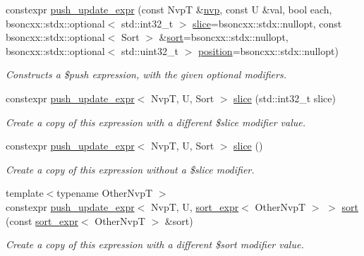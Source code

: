 \begin{DoxyCompactItemize}
\item 
constexpr \hyperlink{classmangrove_1_1push__update__expr_aa1a622b1363907707cd17a30ab5a6a01}{push\+\_\+update\+\_\+expr} (const NvpT \&\hyperlink{classmangrove_1_1nvp}{nvp}, const U \&val, bool each, bsoncxx\+::stdx\+::optional$<$ std\+::int32\+\_\+t $>$ \hyperlink{classmangrove_1_1push__update__expr_a2980ff871acc817f16c1745c8c826ada}{slice}=bsoncxx\+::stdx\+::nullopt, const bsoncxx\+::stdx\+::optional$<$ Sort $>$ \&\hyperlink{classmangrove_1_1push__update__expr_a170e82be0de4d0d4996ea3f7db6f8766}{sort}=bsoncxx\+::stdx\+::nullopt, bsoncxx\+::stdx\+::optional$<$ std\+::uint32\+\_\+t $>$ \hyperlink{classmangrove_1_1push__update__expr_ae4ee751327e25ba7063174305907db41}{position}=bsoncxx\+::stdx\+::nullopt)
\begin{DoxyCompactList}\small\item\em Constructs a \$push expression, with the given optional modifiers. \end{DoxyCompactList}\item 
constexpr \hyperlink{classmangrove_1_1push__update__expr}{push\+\_\+update\+\_\+expr}$<$ NvpT, U, Sort $>$ \hyperlink{classmangrove_1_1push__update__expr_a2980ff871acc817f16c1745c8c826ada}{slice} (std\+::int32\+\_\+t slice)
\begin{DoxyCompactList}\small\item\em Create a copy of this expression with a different \$slice modifier value. \end{DoxyCompactList}\item 
constexpr \hyperlink{classmangrove_1_1push__update__expr}{push\+\_\+update\+\_\+expr}$<$ NvpT, U, Sort $>$ \hyperlink{classmangrove_1_1push__update__expr_a33446894ef0a2a5fbfe298d1bb09ef7a}{slice} ()
\begin{DoxyCompactList}\small\item\em Create a copy of this expression without a \$slice modifier. \end{DoxyCompactList}\item 
{\footnotesize template$<$typename Other\+NvpT $>$ }\\constexpr \hyperlink{classmangrove_1_1push__update__expr}{push\+\_\+update\+\_\+expr}$<$ NvpT, U, \hyperlink{classmangrove_1_1sort__expr}{sort\+\_\+expr}$<$ Other\+NvpT $>$ $>$ \hyperlink{classmangrove_1_1push__update__expr_a170e82be0de4d0d4996ea3f7db6f8766}{sort} (const \hyperlink{classmangrove_1_1sort__expr}{sort\+\_\+expr}$<$ Other\+NvpT $>$ \&sort)
\begin{DoxyCompactList}\small\item\em Create a copy of this expression with a different \$sort modifier value. \end{DoxyCompactList}\item 

\end{DoxyCompactItemize}
